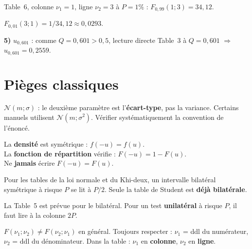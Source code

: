 \documentclass[11pt,a4paper]{article}
\newcommand{\N}{\mathcal{N}}
\begin{document}
Table~6, colonne $\nu_1=1$, ligne $\nu_2=3$ \`a $P=1\%$ : $F_{0{,}99}(1;3) = 34{,}12$.

$F_{0{,}01}(3;1) = 1/34{,}12 \approx 0{,}0293$.

\medskip
\textbf{5)} $u_{0{,}601}$ : comme $Q = 0{,}601 > 0{,}5$, lecture directe Table~3 \`a $Q = 0{,}601$ $\Rightarrow$ $u_{0{,}601} = 0{,}2559$.

\newpage
\section{Pi\`eges classiques}

\begin{alertbox}
$\N(m;\sigma)$ : le deuxi\`eme param\`etre est l'\textbf{\'ecart-type}, pas la variance. Certains manuels utilisent $\N(m;\sigma^2)$. V\'erifier syst\'ematiquement la convention de l'\'enonc\'e.
\end{alertbox}

\begin{alertbox}[Pi\`ege 2 -- Confondre $f(-u) = f(u)$ et $F(-u) = 1-F(u)$]
La \textbf{densit\'e} est sym\'etrique : $f(-u) = f(u)$.\\
La \textbf{fonction de r\'epartition} v\'erifie : $F(-u) = 1 - F(u)$.\\
Ne \textbf{jamais} \'ecrire $F(-u) = F(u)$.
\end{alertbox}

\begin{alertbox}
Pour les tables de la loi normale et du Khi-deux, un intervalle bilat\'eral sym\'etrique \`a risque $P$ se lit \`a $P/2$. Seule la table de Student est \textbf{d\'ej\`a bilat\'erale}.
\end{alertbox}

\begin{alertbox}
La Table~5 est pr\'evue pour le bilat\'eral. Pour un test \textbf{unilat\'eral} \`a risque $P$, il faut lire \`a la colonne $2P$.
\end{alertbox}

\begin{alertbox}
$F(\nu_1;\nu_2) \neq F(\nu_2;\nu_1)$ en g\'en\'eral. Toujours respecter : $\nu_1$ = ddl du num\'erateur, $\nu_2$ = ddl du d\'enominateur. Dans la table : $\nu_1$ en \textbf{colonne}, $\nu_2$ en \textbf{ligne}.
\end{alertbox}
\end{document}
